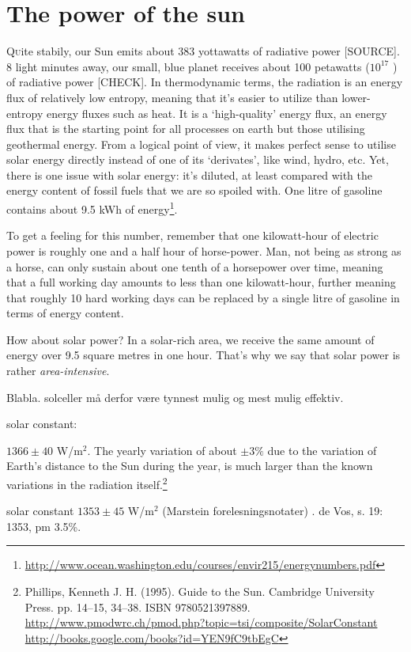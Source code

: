 \documentclass[11pt,bibliography=totoc,index=totoc]{scrbook}   %
\begin{document}
\section{The power of the sun}
\lettrine[lines=3,slope=0pt,nindent=0pt,lraise=0.12]{Q}uite
stabily, our Sun emits about 383 yottawatts of radiative power [SOURCE]. 
8 light minutes away, our small, blue planet receives about 100 petawatts ($10^{17}$
) of radiative power [CHECK].
In thermodynamic terms, the radiation is an
energy flux of relatively low entropy, meaning that it's easier to utilize
than lower-entropy energy fluxes such as heat. It is a `high-quality' energy
flux, an energy flux that is the starting point for all processes on earth
but those utilising geothermal energy. From a logical point of view, it makes
perfect sense to utilise solar energy directly instead of one of its
`derivates', like wind, hydro, etc. Yet, there is one issue with solar
energy: it's diluted, at least compared with the energy content of fossil
fuels that we are so spoiled with. One litre of gasoline contains about 9.5 kWh of
energy\footnote{\url{http://www.ocean.washington.edu/courses/envir215/energynumbers.pdf}}.

To get a feeling for this number, remember that one kilowatt-hour of electric power 
is roughly one and a half hour of horse-power. Man, not being as strong as a
horse, can only sustain about one tenth of a horsepower over time, meaning that a 
full working day amounts to less than one kilowatt-hour, further meaning that 
roughly 10 hard working days can be replaced by a single litre of gasoline in terms
of energy content. 

How about solar power? In a solar-rich area, we receive the same amount of energy 
over 9.5 square metres in one hour. That's why we say that solar power is rather
\emph{area-intensive}.

Blabla. solceller må derfor være tynnest mulig og mest mulig effektiv.

solar constant: 

$1366\pm 40$ W/m$^2$. The yearly variation of about $\pm 3\%$ 
due to the variation of Earth's distance to the Sun during the year, is much
larger than the known variations in the radiation itself.\footnote{
Phillips, Kenneth J. H. (1995). Guide to the Sun. Cambridge University Press. 
pp. 14–15, 34–38. ISBN 9780521397889.
\url{http://www.pmodwrc.ch/pmod.php?topic=tsi/composite/SolarConstant}
\url{http://books.google.com/books?id=YEN9fC9tbEgC}
}

solar constant $1353\pm 45$ W/m$^2$ (Marstein forelesningsnotater)
. de Vos, s. 19: 1353, pm 3.5\%.
\end{document}
